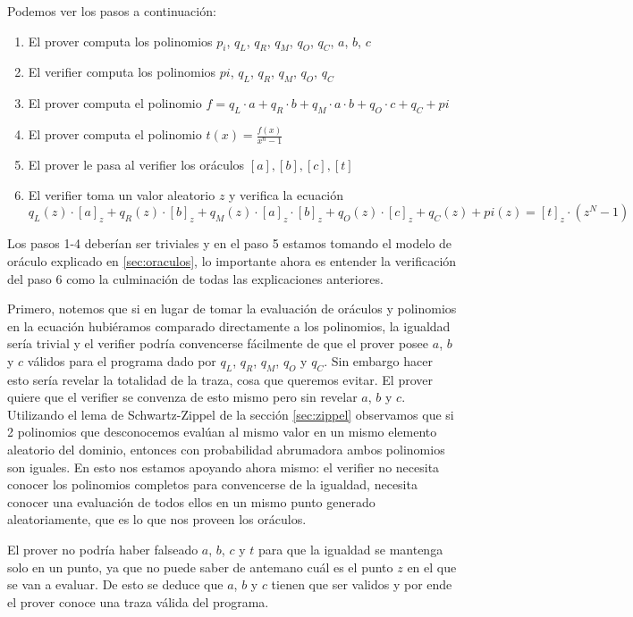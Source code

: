 Podemos ver los pasos a continuación:

\begin{enumerate}
    \item El prover computa los polinomios  $p_i$, $q_L$, $q_R$, $q_M$, $q_O$, $q_C$, $a$, $b$, $c$
    \item El verifier computa los polinomios $pi$, $q_L$, $q_R$, $q_M$, $q_O$, $q_C$
    \item El prover computa el polinomio $f = q_L \cdot a + q_R \cdot b + q_M \cdot a \cdot b + q_O \cdot c + q_C + pi$
    \item El prover computa el polinomio $t(x) = \frac{f(x)}{x^n-1}$
    \item El prover le pasa al verifier los oráculos $[a], [b], [c], [t]$
    \item El verifier toma un valor aleatorio $z$ y verifica la ecuación 
    $$q_L(z) \cdot [a]_z + q_R(z) \cdot [b]_z + q_M(z) \cdot [a]_z \cdot [b]_z + q_O(z) \cdot [c]_z + q_C(z) + pi(z) = [t]_z \cdot (z^N-1)$$
\end{enumerate}

Los pasos 1-4 deberían ser triviales y en el paso 5 estamos tomando el modelo de oráculo explicado en \ref{sec:oraculos}, lo importante ahora es entender la verificación del paso 6 como la culminación de todas las explicaciones anteriores.

Primero, notemos que si en lugar de tomar la evaluación de oráculos y polinomios en la ecuación hubiéramos comparado directamente a los polinomios, la igualdad sería trivial y el verifier podría convencerse fácilmente de que el prover posee $a$, $b$ y $c$ válidos para el programa dado por $q_L$, $q_R$, $q_M$, $q_O$ y $q_C$. Sin embargo hacer esto sería revelar la totalidad de la traza, cosa que queremos evitar. El prover quiere que el verifier se convenza de esto mismo pero sin revelar $a$, $b$ y $c$. Utilizando el lema de Schwartz-Zippel de la sección \ref{sec:zippel} observamos que si 2 polinomios que desconocemos evalúan al mismo valor en un mismo elemento aleatorio del dominio, entonces con probabilidad abrumadora ambos polinomios son iguales. En esto nos estamos apoyando ahora mismo: el verifier no necesita conocer los polinomios completos para convencerse de la igualdad, necesita conocer una evaluación de todos ellos en un mismo punto generado aleatoriamente, que es lo que nos proveen los oráculos. 

El prover no podría haber falseado $a$, $b$, $c$ y $t$ para que la igualdad se mantenga solo en un punto, ya que no puede saber de antemano cuál es el punto $z$ en el que se van a evaluar. De esto se deduce que $a$, $b$ y $c$ tienen que ser validos y por ende el prover conoce una traza válida del programa.

